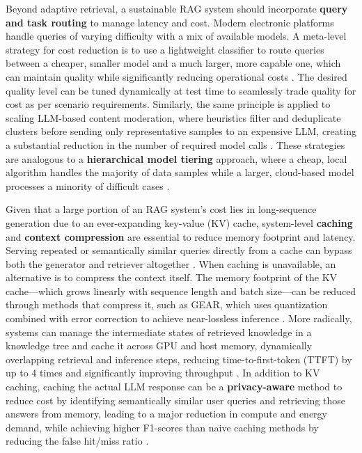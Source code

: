 \documentclass[11pt]{article}
\begin{document}
Beyond adaptive retrieval, a sustainable RAG system should incorporate \textbf{query and task routing} to manage latency and cost. Modern electronic platforms handle queries of varying difficulty with a mix of available models. A meta-level strategy for cost reduction is to use a lightweight classifier to route queries between a cheaper, smaller model and a much larger, more capable one, which can maintain quality while significantly reducing operational costs \cite{ref458}. The desired quality level can be tuned dynamically at test time to seamlessly trade quality for cost as per scenario requirements. Similarly, the same principle is applied to scaling LLM-based content moderation, where heuristics filter and deduplicate clusters before sending only representative samples to an expensive LLM, creating a substantial reduction in the number of required model calls \cite{ref459}. These strategies are analogous to a \textbf{hierarchical model tiering} approach, where a cheap, local algorithm handles the majority of data samples while a larger, cloud-based model processes a minority of difficult cases \cite{ref460}.

Given that a large portion of an RAG system's cost lies in long-sequence generation due to an ever-expanding key-value (KV) cache, system-level \textbf{caching} and \textbf{context compression} are essential to reduce memory footprint and latency. Serving repeated or semantically similar queries directly from a cache can bypass both the generator and retriever altogether \cite{ref461}. When caching is unavailable, an alternative is to compress the context itself. The memory footprint of the KV cache---which grows linearly with sequence length and batch size---can be reduced through methods that compress it, such as GEAR, which uses quantization combined with error correction to achieve near-lossless inference \cite{ref171}. More radically, systems can manage the intermediate states of retrieved knowledge in a knowledge tree and cache it across GPU and host memory, dynamically overlapping retrieval and inference steps, reducing time-to-first-token (TTFT) by up to 4 times and significantly improving throughput \cite{ref462}. In addition to KV caching, caching the actual LLM response can be a \textbf{privacy-aware} method to reduce cost by identifying semantically similar user queries and retrieving those answers from memory, leading to a major reduction in compute and energy demand, while achieving higher F1-scores than naive caching methods by reducing the false hit/miss ratio \cite{ref461}.
\end{document}
